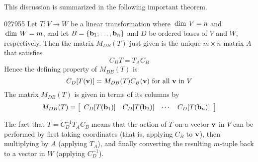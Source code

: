 \noindent This discussion is summarized in the following important theorem.


\begin{theorem}{}{027955}
Let $T : V \to W$ be a linear transformation where $\thinspace\operatorname{dim \medspace}V = n$ and $\thinspace\operatorname{dim \medspace}W = m$, and let $B = \{\textbf{b}_{1}, \dots, \textbf{b}_{n}\}$ and $D$ be ordered bases of $V$ and $W$, respectively. Then the matrix $M_{DB}(T)$ just given is the unique $m \times n$ matrix $A$ that satisfies
\begin{equation*}
C_DT = T_AC_B
\end{equation*}
Hence the defining property of $M_{DB}(T)$ is
\begin{equation*}
C_D[T(\textbf{v})] = M_{DB}(T)C_B(\textbf{v}) \mbox{ for all } \textbf{v} \mbox{ in } V
\end{equation*}
The matrix $M_{DB}(T)$ is given in terms of its columns by
\begin{equation*}
  M_{DB}(T) = \left[
\begin{array}{cccc}
 C_D[T(\textbf{b}_1)] & C_D[T(\textbf{b}_2)] & \cdots & C_D[T(\textbf{b}_n)] 
\end{array}\right]
\end{equation*}
\end{theorem}

\noindent The fact that $T = C_D^{-1}T_AC_B$ means that the action of $T$ on a vector $\textbf{v}$ in $V$ can be performed by first taking coordinates (that is, applying $C_{B}$ to $\textbf{v}$), then multiplying by $A$ (applying $T_{A}$), and finally converting the resulting $m$-tuple back to a vector in $W$ (applying $C_D^{-1}$).


